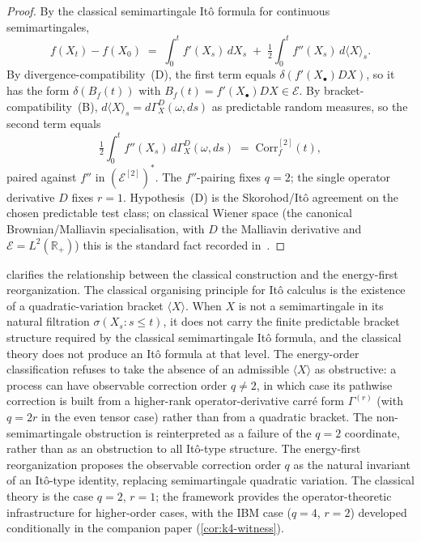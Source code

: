 \documentclass[11pt,reqno]{amsart}
\theoremstyle{plain}
\theoremstyle{definition}
\theoremstyle{remark}
\newcommand{\R}{\mathbb{R}}
\newcommand{\Energy}{\mathcal{E}}
\newcommand{\Carre}{\Gamma}
\begin{document}
\begin{proof}
By the classical semimartingale It\^o formula for continuous
semimartingales,
\[
  f(X_t)-f(X_0)
   \;=\;\int_0^{t}f'(X_s)\,dX_s
   \;+\;\tfrac12\!\int_0^{t}f''(X_s)\,d\langle X\rangle_s.
\]
By divergence-compatibility~(D), the first term equals
$\delta(f'(X_\bullet)DX)$, so it has the form $\delta(B_f(t))$ with
$B_f(t)=f'(X_\bullet)DX\in\Energy$.
By bracket-compatibility~(B), $d\langle X\rangle_s=d\Carre^{D}_{X}(\omega,ds)$
as predictable random measures, so the second term equals
\[
  \tfrac12\!\int_0^{t}f''(X_s)\,d\Carre^{D}_{X}(\omega,ds)
   \;=\;\mathrm{Corr}_f^{[2]}(t),
\]
paired against $f''$ in $(\Energy^{[2]})^{*}$. The $f''$-pairing
fixes $q=2$; the single operator derivative $D$ fixes $r=1$.
Hypothesis~(D) is the Skorohod/It\^o agreement on the chosen
predictable test class; on classical Wiener space (the canonical
Brownian/Malliavin specialisation, with $D$ the Malliavin derivative
and $\Energy=L^{2}(\R_{+})$) this is the standard fact recorded
in~\cite{Nualart}.
\end{proof}

 clarifies the relationship between
the classical construction and the energy-first reorganization. The
classical organising principle for It\^o calculus is the existence
of a quadratic-variation bracket $\langle X\rangle$. When $X$ is not
a semimartingale in its natural filtration $\sigma(X_s:s\le t)$, it
does not carry the finite predictable bracket structure required by
the classical semimartingale It\^o formula, and the classical theory
does not produce an It\^o formula at that level. The energy-order
classification refuses to take the absence of an admissible
$\langle X\rangle$ as obstructive: a process can have observable
correction order $q\ne 2$, in which case its pathwise correction is
built from a higher-rank operator-derivative carr\'e form
$\Carre^{(r)}$ (with $q=2r$ in the even tensor case) rather than from
a quadratic bracket. The non-semimartingale obstruction is
reinterpreted as a failure of the $q=2$ coordinate, rather than as an
obstruction to all It\^o-type structure.
The energy-first reorganization proposes the observable correction
order $q$ as the natural invariant of an It\^o-type identity, replacing
semimartingale quadratic variation. The classical theory is the case
$q=2$, $r=1$; the framework provides the operator-theoretic
infrastructure for higher-order cases, with the IBM case ($q=4$,
$r=2$) developed conditionally in the companion paper
(\cref{cor:k4-witness}).
\end{document}
